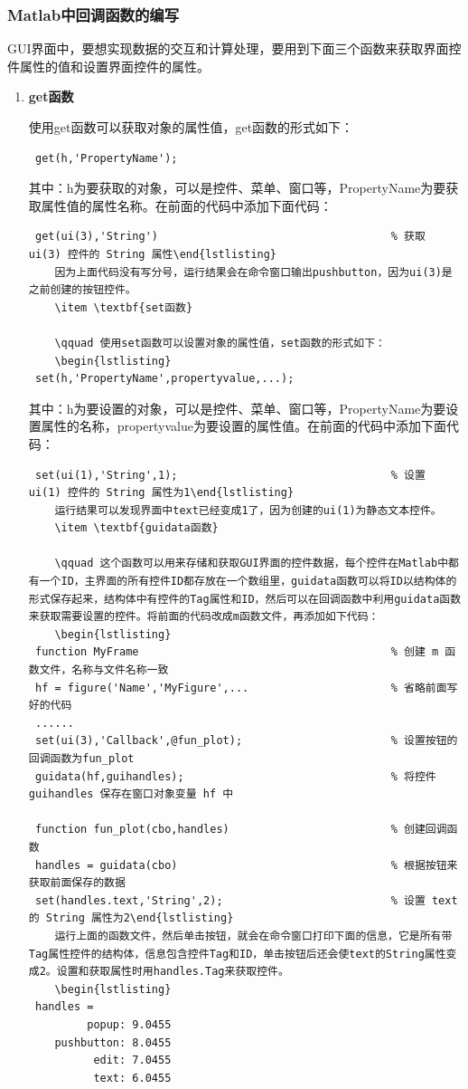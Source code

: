 \subsubsection{Matlab中回调函数的编写}
GUI界面中，要想实现数据的交互和计算处理，要用到下面三个函数来获取界面控件属性的值和设置界面控件的属性。
\begin{enumerate}
	\item \textbf{get函数}

	\qquad 使用get函数可以获取对象的属性值，get函数的形式如下：
	\begin{lstlisting}
 get(h,'PropertyName');\end{lstlisting}
 	其中：h为要获取的对象，可以是控件、菜单、窗口等，PropertyName为要获取属性值的属性名称。在前面的代码中添加下面代码：
	 \begin{lstlisting}
 get(ui(3),'String')									% 获取 ui(3) 控件的 String 属性\end{lstlisting}
 	因为上面代码没有写分号，运行结果会在命令窗口输出pushbutton，因为ui(3)是之前创建的按钮控件。
	\item \textbf{set函数}

	\qquad 使用set函数可以设置对象的属性值，set函数的形式如下：
	\begin{lstlisting}
 set(h,'PropertyName',propertyvalue,...);\end{lstlisting}
 	其中：h为要设置的对象，可以是控件、菜单、窗口等，PropertyName为要设置属性的名称，propertyvalue为要设置的属性值。在前面的代码中添加下面代码：
	 \begin{lstlisting}
 set(ui(1),'String',1);									% 设置 ui(1) 控件的 String 属性为1\end{lstlisting}
 	运行结果可以发现界面中text已经变成1了，因为创建的ui(1)为静态文本控件。
	\item \textbf{guidata函数}

	\qquad 这个函数可以用来存储和获取GUI界面的控件数据，每个控件在Matlab中都有一个ID，主界面的所有控件ID都存放在一个数组里，guidata函数可以将ID以结构体的形式保存起来，结构体中有控件的Tag属性和ID，然后可以在回调函数中利用guidata函数来获取需要设置的控件。将前面的代码改成m函数文件，再添加如下代码：
	\begin{lstlisting}
 function MyFrame										% 创建 m 函数文件，名称与文件名称一致
 hf = figure('Name','MyFigure',...						% 省略前面写好的代码
 ......
 set(ui(3),'Callback',@fun_plot);						% 设置按钮的回调函数为fun_plot
 guidata(hf,guihandles);								% 将控件 guihandles 保存在窗口对象变量 hf 中

 function fun_plot(cbo,handles)							% 创建回调函数
 handles = guidata(cbo)									% 根据按钮来获取前面保存的数据
 set(handles.text,'String',2);							% 设置 text 的 String 属性为2\end{lstlisting}
 	运行上面的函数文件，然后单击按钮，就会在命令窗口打印下面的信息，它是所有带Tag属性控件的结构体，信息包含控件Tag和ID，单击按钮后还会使text的String属性变成2。设置和获取属性时用handles.Tag来获取控件。
	\begin{lstlisting}
 handles = 
         popup: 9.0455
    pushbutton: 8.0455
          edit: 7.0455
          text: 6.0455\end{lstlisting}
\end{enumerate}

